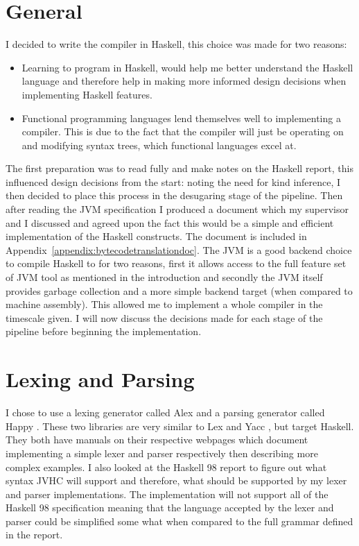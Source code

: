 \documentclass[float=false, crop=false]{standalone}
\begin{document}
\section{General}

I decided to write the compiler in Haskell, this choice was made for two reasons: 
\begin{itemize}
  \item Learning to program in Haskell, would help me better understand the Haskell language
    and therefore help in making more informed design decisions when implementing Haskell features.

  \item Functional programming languages lend themselves well to implementing a compiler. This is due to the fact that the compiler will just be operating
    on and modifying syntax trees, which functional languages excel at.

\end{itemize}

  The first preparation was to read fully and make notes on
  the Haskell report, this influenced design decisions from the start:
  noting the need for kind inference, I then decided to 
  place this process in the desugaring stage of the pipeline. 
  Then after reading the JVM 
  specification \cite{jvm-spec8} I produced a
  document which my supervisor and I discussed and agreed
  upon the fact this would be a simple and efficient implementation
  of the Haskell constructs. The document is included in 
  Appendix~\ref{appendix:bytecodetranslationdoc}. 
  The JVM is a good backend choice to compile Haskell to for two
  reasons, first it allows access to the full feature set
  of JVM tool as mentioned in the introduction and secondly
  the JVM itself provides garbage collection and 
  a more simple backend target (when compared to machine assembly).
  This allowed me to implement a whole compiler in the timescale given.
  I will now discuss the decisions made for each stage of the 
  pipeline before beginning the implementation.

\section{Lexing and Parsing}

I chose to use a lexing generator called Alex \cite{alex-lib} and a parsing generator called Happy \cite{happy-lib}.
These two libraries are very similar to Lex \cite{lex-lib} and Yacc
\cite{yacc-lib}, but target Haskell.
They both have manuals on their respective webpages which document 
implementing a simple lexer and parser respectively then describing
more complex examples.
I also looked at the Haskell 98 report \cite[.,3.]{haskell98-spec}
to figure out what syntax JVHC will support and therefore, what 
should be supported by my lexer and parser implementations.
The implementation will not support all of the Haskell 98 
specification meaning that the language accepted by the lexer and 
parser could be simplified some what when compared to the full
grammar defined in the report.
\end{document}
